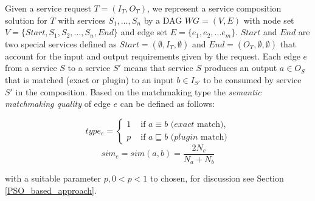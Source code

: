 \documentclass{llncs}
\begin{document}
Given a service request $T=(I_T,O_T)$, we represent a service composition solution for $T$ with services $S_1,\ldots,S_n$  by a DAG $WG=(V,E)$ with node set $V=\{Start, S_1, S_2, \ldots, S_n, End\}$ and edge set $E = \{e_{1}, e_{2},... e_{m} \}$. $Start$ and $End$ are two special services defined as $Start = (\emptyset, I_T, \emptyset )$ and $End  = (O_T, \emptyset, \emptyset)$ that account for the input and output requirements given by the request. 
Each edge $e$ from a service $S$ to a service $S'$ means that service $S$ produces an output $a\in O_S$ that is matched (exact or plugin) to an input $b\in I_{S'}$ to be consumed by service $S'$ in the composition. Based on the matchmaking type the \emph{semantic matchmaking quality} of edge $e$ can be defined as follows:

\begin{equation}
\label{equation10}
type_e = 
\begin{cases}
	1 & \text{ if $a\equiv b$ ($exact$ match)},\\
	p & \text{ if $a \sqsubseteq b$ ($plugin$ match)}
\end{cases}
\end{equation}
\begin{equation}
\label{equation11}
sim_e = sim(a,b) = \frac{2N_c}{N_{a}+N_{b}}
\end{equation}

\noindent with a suitable parameter $p, 0<p< 1$ to chosen, for discussion see Section \ref{PSO_based_approach}.



\end{document}
